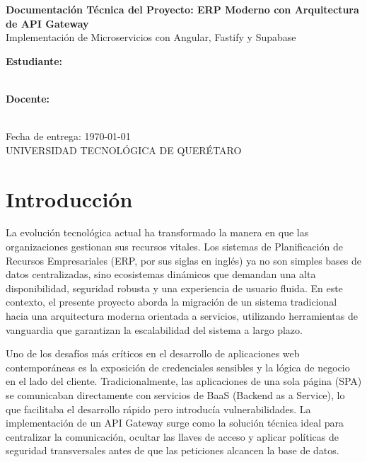 \documentclass[12pt,a4paper]{article}
\begin{document}
\begin{titlepage}
    \centering
    \vspace*{1cm}
    \Huge
    \textbf{Documentación Técnica del Proyecto: ERP Moderno con Arquitectura de API Gateway} \\
    \vspace{1.5cm}
    \Large
    Implementación de Microservicios con Angular, Fastify y Supabase \\
    \vspace{2cm}
    
    \textbf{Estudiante:} \\
    [LUIS FELIPE MONTES VELAZQUEZ] \\
    \vspace{1cm}
    
    \textbf{Docente:} \\
    [EMMANUEL MARTINEZ HERNANDEZ] \\
    \vspace{2cm}
    
    \vfill
    \large
    Fecha de entrega: \today \\
   UNIVERSIDAD TECNOLÓGICA DE QUERÉTARO
\end{titlepage}

\newpage

\tableofcontents
\listoffigures
\newpage

\section{Introducción}
La evolución tecnológica actual ha transformado la manera en que las organizaciones gestionan sus recursos vitales. Los sistemas de Planificación de Recursos Empresariales (ERP, por sus siglas en inglés) ya no son simples bases de datos centralizadas, sino ecosistemas dinámicos que demandan una alta disponibilidad, seguridad robusta y una experiencia de usuario fluida. En este contexto, el presente proyecto aborda la migración de un sistema tradicional hacia una arquitectura moderna orientada a servicios, utilizando herramientas de vanguardia que garantizan la escalabilidad del sistema a largo plazo.

Uno de los desafíos más críticos en el desarrollo de aplicaciones web contemporáneas es la exposición de credenciales sensibles y la lógica de negocio en el lado del cliente. Tradicionalmente, las aplicaciones de una sola página (SPA) se comunicaban directamente con servicios de BaaS (Backend as a Service), lo que facilitaba el desarrollo rápido pero introducía vulnerabilidades. La implementación de un API Gateway surge como la solución técnica ideal para centralizar la comunicación, ocultar las llaves de acceso y aplicar políticas de seguridad transversales antes de que las peticiones alcancen la base de datos.
\end{document}
